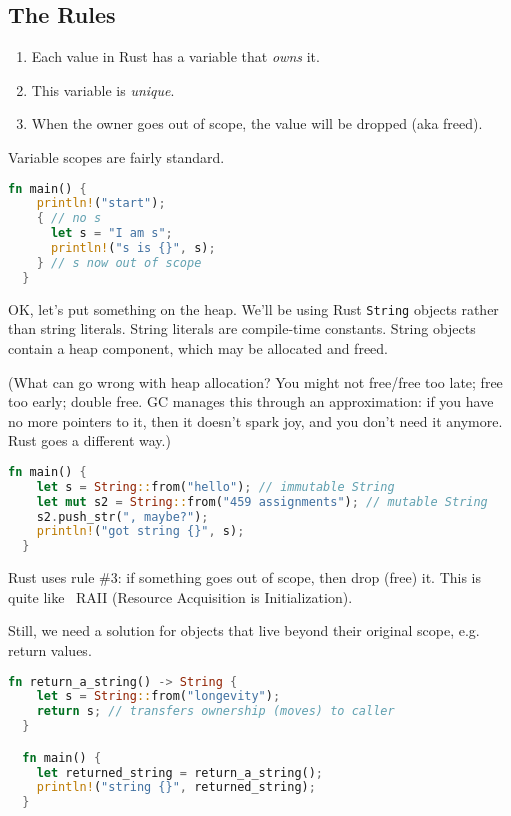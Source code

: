 \subsection*{The Rules}
\begin{enumerate}[noitemsep]
\item Each value in Rust has a variable that \emph{owns} it.
\item This variable is \emph{unique}.
\item When the owner goes out of scope, the value will be dropped (aka freed).
\end{enumerate}

Variable scopes are fairly standard.
\begin{lstlisting}[language=Rust]
  fn main() {
    println!("start");
    { // no s
      let s = "I am s";
      println!("s is {}", s);
    } // s now out of scope
  }
\end{lstlisting}

OK, let's put something on the heap. We'll be using Rust {\tt String} objects rather than
string literals. String literals are compile-time constants. String objects contain a heap component,
which may be allocated and freed.

(What can go wrong with heap allocation? You might not free/free too late;
free too early; double free. GC manages this through an approximation: if you have no more pointers to it,
then it doesn't spark joy, and you don't need it anymore. Rust goes a different way.)
\begin{lstlisting}[language=Rust]
  fn main() {
    let s = String::from("hello"); // immutable String
    let mut s2 = String::from("459 assignments"); // mutable String
    s2.push_str(", maybe?");
    println!("got string {}", s);
  }
\end{lstlisting}

Rust uses rule \#3: if something goes out of scope, then drop (free) it.
This is quite like \CPP~RAII (Resource Acquisition is Initialization).

Still, we need a solution for objects that live beyond their original scope, e.g.
return values.
\begin{lstlisting}[language=Rust]
  fn return_a_string() -> String {
    let s = String::from("longevity");
    return s; // transfers ownership (moves) to caller
  }

  fn main() {
    let returned_string = return_a_string();
    println!("string {}", returned_string);
  }
\end{lstlisting}

